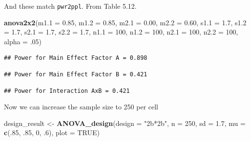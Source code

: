 \documentclass[]{book}
\newenvironment{Shaded}{\begin{snugshade}}{\end{snugshade}}
\newcommand{\DataTypeTok}[1]{\textcolor[rgb]{0.13,0.29,0.53}{#1}}
\newcommand{\DecValTok}[1]{\textcolor[rgb]{0.00,0.00,0.81}{#1}}
\newcommand{\FloatTok}[1]{\textcolor[rgb]{0.00,0.00,0.81}{#1}}
\newcommand{\KeywordTok}[1]{\textcolor[rgb]{0.13,0.29,0.53}{\textbf{#1}}}
\newcommand{\NormalTok}[1]{#1}
\newcommand{\OtherTok}[1]{\textcolor[rgb]{0.56,0.35,0.01}{#1}}
\newcommand{\StringTok}[1]{\textcolor[rgb]{0.31,0.60,0.02}{#1}}
\begin{document}
And these match \texttt{pwr2ppl}. From Table 5.12.

\begin{Shaded}
\begin{Highlighting}[]
\KeywordTok{anova2x2}\NormalTok{(}\DataTypeTok{m1.1 =} \FloatTok{0.85}\NormalTok{, }\DataTypeTok{m1.2 =} \FloatTok{0.85}\NormalTok{, }\DataTypeTok{m2.1 =} \FloatTok{0.00}\NormalTok{, }\DataTypeTok{m2.2 =} \FloatTok{0.60}\NormalTok{,}
         \DataTypeTok{s1.1 =} \FloatTok{1.7}\NormalTok{, }\DataTypeTok{s1.2 =} \FloatTok{1.7}\NormalTok{, }\DataTypeTok{s2.1 =} \FloatTok{1.7}\NormalTok{, }\DataTypeTok{s2.2 =} \FloatTok{1.7}\NormalTok{,}
         \DataTypeTok{n1.1 =} \DecValTok{100}\NormalTok{, }\DataTypeTok{n1.2 =} \DecValTok{100}\NormalTok{, }\DataTypeTok{n2.1 =} \DecValTok{100}\NormalTok{, }\DataTypeTok{n2.2 =} \DecValTok{100}\NormalTok{,}
         \DataTypeTok{alpha =} \FloatTok{.05}\NormalTok{)}
\end{Highlighting}
\end{Shaded}

\begin{verbatim}
## Power for Main Effect Factor A = 0.898
\end{verbatim}

\begin{verbatim}
## Power for Main Effect Factor B = 0.421
\end{verbatim}

\begin{verbatim}
## Power for Interaction AxB = 0.421
\end{verbatim}

Now we can increase the sample size to 250 per cell

\begin{Shaded}
\begin{Highlighting}[]
\NormalTok{design_result <-}\StringTok{ }\KeywordTok{ANOVA_design}\NormalTok{(}\DataTypeTok{design =} \StringTok{"2b*2b"}\NormalTok{,}
                              \DataTypeTok{n =} \DecValTok{250}\NormalTok{,}
                              \DataTypeTok{sd =} \FloatTok{1.7}\NormalTok{,}
                              \DataTypeTok{mu =} \KeywordTok{c}\NormalTok{(.}\DecValTok{85}\NormalTok{, }\FloatTok{.85}\NormalTok{, }
                                     \DecValTok{0}\NormalTok{, }\FloatTok{.6}\NormalTok{),}
                              \DataTypeTok{plot =} \OtherTok{TRUE}\NormalTok{)}
\end{Highlighting}
\end{Shaded}
\end{document}
